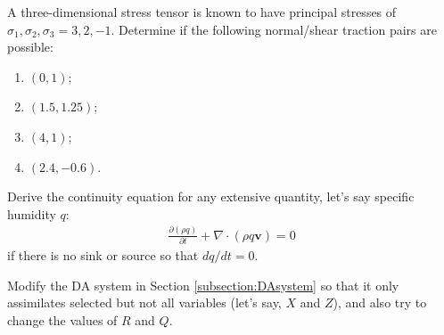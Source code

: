 \begin{Exercise}
A three-dimensional stress tensor is known to have principal stresses of $\sigma_1, \sigma_2, \sigma_3 = 3,2,-1$. Determine if the following normal/shear traction pairs are possible:
\begin{enumerate}[label=(\alph*)]
    \item $(0,1)$;
    \item $(1.5,1.25)$;
    \item $(4,1)$;
    \item $(2.4,-0.6)$.
\end{enumerate}
\end{Exercise}

\begin{Exercise}
Derive the continuity equation for any extensive quantity, let's say specific humidity $q$:
\begin{align*}
\frac{\partial (\rho q)}{\partial t} + \nabla \cdot(\rho q \textbf{v}) = 0
\end{align*}
if there is no sink or source so that $dq/dt=0$.
\end{Exercise}

\begin{Exercise}
Modify the DA system in Section \ref{subsection:DAsystem} so that it only assimilates selected but not all variables (let's say, $X$ and $Z$), and also try to change the values of $R$ and $Q$.
\end{Exercise}
